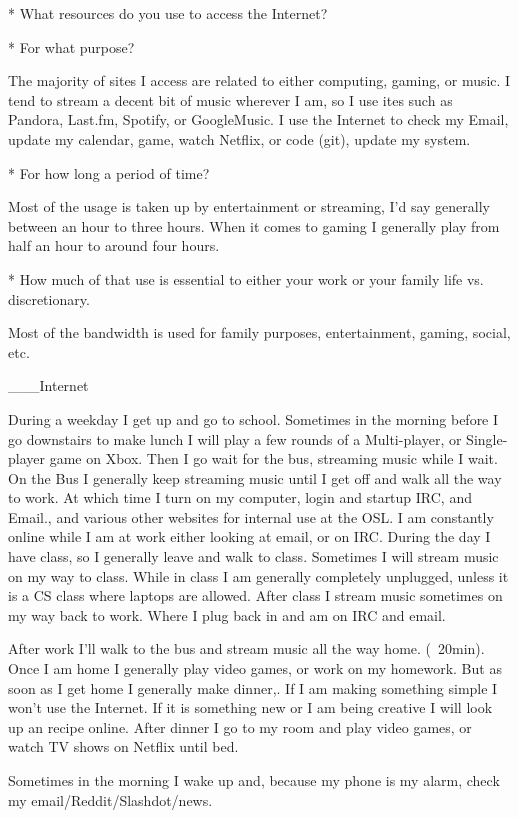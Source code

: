 \documentclass[12pt,letterpaper]{article}
\begin{document}
* What resources do you use to access the Internet?

* For what purpose?

The majority of sites I access are related to either computing,
gaming, or music. I tend to stream a decent bit of music wherever I am,
so I use ites such as Pandora, Last.fm, Spotify, or GoogleMusic. I use
the Internet to check my Email, update my calendar, game, watch Netflix,
or code (git), update my system.


* For how long a period of time?

Most of the usage is taken up by entertainment or streaming, I'd
say generally between an hour to three hours. When it comes to gaming I
generally play from half an hour to around four hours.


* How much of that use is essential to either your work or your family life vs. discretionary.

Most of the bandwidth is used for family purposes, entertainment,
gaming, social, etc. 





___Internet


During a weekday I get up and go to school. Sometimes in the morning
before I go downstairs to make lunch I will play a few rounds of a
Multi-player, or Single-player game on Xbox. Then I go wait for the bus,
streaming music while I wait. On the Bus I generally keep streaming
music until I get off and walk all the way to work. At which time I turn
on my computer, login and startup IRC, and Email., and various other
websites for internal use at the OSL. I am constantly online while I am
at work either looking at email, or on IRC. During the day I have class,
so I generally leave and walk to class. Sometimes I will stream music on
my way to class. While in class I am generally completely unplugged,
unless it is a CS class where laptops are allowed.  After class I stream
music sometimes on my way back to work.  Where I plug back in and am on
IRC and email.

After work I'll walk to the bus and stream music all the way home.
(~20min). Once I am home I generally play video games, or work on my
homework. But as soon as I get home I generally make dinner,. If I am
making something simple I won't use the Internet. If it is something new
or I am being creative I will look up an recipe online. After dinner I
go to my room and play video games, or watch TV shows on Netflix until
bed.

Sometimes in the morning I wake up and, because my phone is my alarm,
check my email/Reddit/Slashdot/news.
\end{document}
